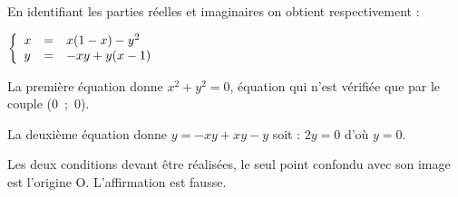 \documentclass[12pt]{cornouaille}
\begin{document}
\begin{exercice}
\begin{enumerate}[resume]
\begin{solution}
En identifiant les parties réelles et imaginaires on obtient respectivement :

$\left\{\begin{array}{l c l}
x&=&x(1 - x) - y^2\\
y&=&- xy + y(x - 1)
\end{array}\right.$

La première équation donne $x^2 + y^2 = 0$, équation qui n'est vérifiée que par le couple (0~;~0).

La deuxième équation donne $y = -xy  + xy - y$ soit : $ 2y = 0$ d'où $y = 0$.

Les deux conditions devant être réalisées, le seul point confondu avec son image est l'origine O. L'affirmation est fausse.
\end{solution}
\end{enumerate}
\end{exercice}



\newpage
\end{document}
